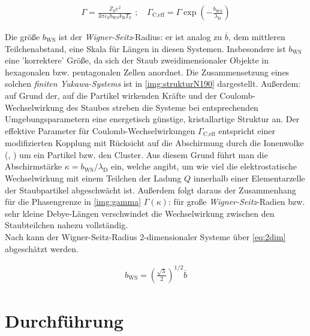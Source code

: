 \documentclass[numbers=noenddot,a4paper,notitlepage,twoside,BCOR15mm]{scrartcl}
\newcommand{\ix}[1]{_\text{#1}}
\newcommand{\tilt}[1]{\textit{#1}}
\begin{document}
			\begin{align}
				\Gamma=\frac{Z\ix{S}e^2}{4\pi\varepsilon\ix{0}b\ix{WS}k\ix{B}T\ix{S}}  \,\,; \quad \Gamma\ix{C,eff}=\Gamma\exp\left(-\frac{b\ix{WS}}{\lambda\ix{D}}\right) \label{eq:kopplung}
			\end{align}

		Die größe $b\ix{WS}$ ist der \tilt{Wigner-Seitz}-Radius: er ist analog zu $\overline{b}$, dem mittleren Teilchenabstand, eine Skala für Längen in diesen Systemen. Insbesondere ist $b\ix{WS}$ eine 'korrektere' Größe, da sich der Staub zweidimensionaler Objekte in hexagonalen bzw. pentagonalen Zellen anordnet. Die Zusammensetzung eines solchen \tilt{finiten Yukawa-Systems} ist in \autoref{img:strukturN190} dargestellt. Außerdem: auf Grund der, auf die Partikel wirkenden Kräfte und der Coulomb-Wechselwirkung des Staubes streben die Systeme bei entsprechenden Umgebungsparametern eine energetisch günstige, kristallartige Struktur an. Der effektive Parameter für Coulomb-Wechselwirkungen $\Gamma\ix{C,eff}$ entspricht einer modifizierten Kopplung mit Rücksicht auf die Abschirmung durch die Ionenwolke (\cite{Lampe00}, \cite{Schweigert00d}) um ein Partikel bzw. den Cluster. Aus diesem Grund führt man die Abschirmstärke $\kappa=b\ix{WS}/\lambda\ix{D}$ ein, welche angibt, um wie viel die elektrostatische Wechselwirkung mit einem Teilchen der Ladung $Q$ innerhalb einer Elementarzelle der Staubpartikel abgeschwächt ist. Außerdem folgt daraus der Zusammenhang für die Phasengrenze in \autoref{img:gamma} $\Gamma\left(\kappa\right)$: für große \tilt{Wigner-Seitz}-Radien bzw. sehr kleine Debye-Längen verschwindet die Wechselwirkung zwischen den Staubteilchen nahezu vollständig.\\
		Nach \cite{WignerRad} kann der Wigner-Seitz-Radius 2-dimensionaler Systeme über \autoref{eq:2dim} abgeschätzt werden.

			\begin{align}
				b\ix{WS}=\left(\frac{\sqrt{3}}{2}\right)^{1/2}\overline{b} \label{eq:2dim}
			\end{align}

	\section{Durchführung}
\end{document}
